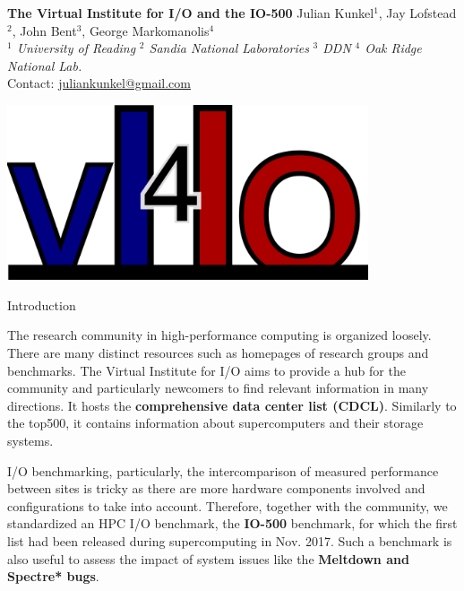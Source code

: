 \documentclass[portrait,a0paper,fontscale=0.4]{baposter}
\begin{document}
\begin{poster}
{}{ %
  \textbf{The Virtual Institute for I/O and the IO-500}
}{ %
  \vspace{0.5em}
  \textsc
  Julian Kunkel$^1$, Jay Lofstead$^2$, John Bent$^3$, George Markomanolis$^4$
  \\[0.5em]
  \emph{$^1$ University of Reading}
  \hspace*{0.25em}
  \emph{$^2$ Sandia National Laboratories}
   \hspace*{0.25em}
  \emph{$^3$ DDN}
  \hspace*{0.25em}
  \emph{$^4$ Oak Ridge National Lab.}
  \\[0.5em]
   Contact: \url{juliankunkel@gmail.com}
}{
    \begin{minipage}{0.2\textwidth}
     \begin{center}
      \includegraphics[width=0.8\textwidth]{logo-vi4io.png}
     \end{center}
    \end{minipage}
}


\begin{posterbox}[name=problem,column=0]
{Introduction}

The research community in high-performance computing is organized loosely.
There are many distinct resources such as homepages of research groups and benchmarks.
The Virtual Institute for I/O aims to provide a hub for the community and particularly newcomers to find relevant information in many directions.
It hosts the \textbf{comprehensive data center list (CDCL)}. Similarly to the top500, it contains information about supercomputers and their storage systems.

I/O benchmarking, particularly, the intercomparison of measured performance between sites is tricky as there are more hardware components involved and configurations to take into account.
Therefore, together with the community, we standardized an HPC I/O benchmark, the \textbf{IO-500} benchmark, for which the first list had been released during supercomputing in Nov. 2017.
Such a benchmark is also useful to assess the impact of system issues like the \textbf{Meltdown and Spectre* bugs}.


\end{posterbox}
\end{poster}
\end{document}

